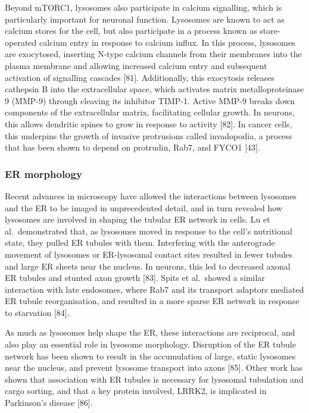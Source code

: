 \documentclass[
  12pt,
  a4paper,
]{book}
\begin{document}
Beyond mTORC1, lysosomes also participate in calcium signalling, which is particularly important for neuronal function. Lysosomes are known to act as calcium stores for the cell, but also participate in a process known as store-operated calcium entry in response to calcium influx. In this process, lysosomes are exocytosed, inserting N-type calcium channels from their membranes into the plasma membrane and allowing increased calcium entry and subsequent activation of signalling cascades {[}81{]}. Additionally, this exocytosis releases cathepsin B into the extracellular space, which activates matrix metalloproteinase 9 (MMP-9) through cleaving its inhibitor TIMP-1. Active MMP-9 breaks down components of the extracellular matrix, facilitating cellular growth. In neurons, this allows dendritic spines to grow in response to activity {[}82{]}. In cancer cells, this underpins the growth of invasive protrusions called invadopodia, a process that has been shown to depend on protrudin, Rab7, and FYCO1 {[}43{]}.

\hypertarget{er-morphology}{%
\subsubsection{ER morphology}\label{er-morphology}}

Recent advances in microscopy have allowed the interactions between lysosomes and the ER to be imaged in unprecedented detail, and in turn revealed how lysosomes are involved in shaping the tubular ER network in cells. Lu et al.~demonstrated that, as lysosomes moved in response to the cell's nutritional state, they pulled ER tubules with them. Interfering with the anterograde movement of lysosomes or ER-lysosomal contact sites resulted in fewer tubules and large ER sheets near the nucleus. In neurons, this led to decreased axonal ER tubules and stunted axon growth {[}83{]}. Spits et al.~showed a similar interaction with late endosomes, where Rab7 and its transport adaptors mediated ER tubule reorganisation, and resulted in a more sparse ER network in response to starvation {[}84{]}.

As much as lysosomes help shape the ER, these interactions are reciprocal, and also play an essential role in lysosome morphology. Disruption of the ER tubule network has been shown to result in the accumulation of large, static lysosomes near the nucleus, and prevent lysosome transport into axons {[}85{]}. Other work has shown that association with ER tubules is necessary for lysosomal tubulation and cargo sorting, and that a key protein involved, LRRK2, is implicated in Parkinson's disease {[}86{]}.
\end{document}
